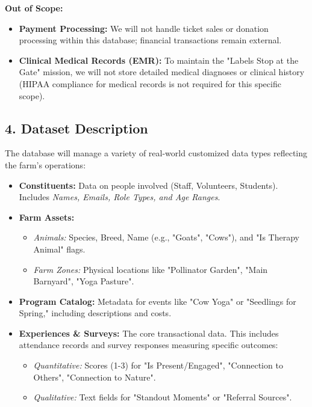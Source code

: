 \documentclass[11pt]{article}
\begin{document}
\textbf{Out of Scope:}
\begin{itemize}
    \item \textbf{Payment Processing:} We will not handle ticket sales or donation processing within this database; financial transactions remain external.
    \item \textbf{Clinical Medical Records (EMR):} To maintain the "Labels Stop at the Gate" mission, we will not store detailed medical diagnoses or clinical history (HIPAA compliance for medical records is not required for this specific scope).
\end{itemize}

\subsection*{4. Dataset Description}
The database will manage a variety of real-world customized data types reflecting the farm's operations:

\begin{itemize}
    \item \textbf{Constituents:} Data on people involved (Staff, Volunteers, Students). Includes \textit{Names, Emails, Role Types, and Age Ranges}.
    \item \textbf{Farm Assets:}
    \begin{itemize}
        \item \textit{Animals:} Species, Breed, Name (e.g., "Goats", "Cows"), and "Is Therapy Animal" flags.
        \item \textit{Farm Zones:} Physical locations like "Pollinator Garden", "Main Barnyard", "Yoga Pasture".
    \end{itemize}
    \item \textbf{Program Catalog:} Metadata for events like "Cow Yoga" or "Seedlings for Spring," including descriptions and costs.
    \item \textbf{Experiences \& Surveys:} The core transactional data. This includes attendance records and survey responses measuring specific outcomes:
    \begin{itemize}
        \item \textit{Quantitative:} Scores (1-3) for "Is Present/Engaged", "Connection to Others", "Connection to Nature".
        \item \textit{Qualitative:} Text fields for "Standout Moments" or "Referral Sources".
    \end{itemize}
\end{itemize}
    
\end{document}
